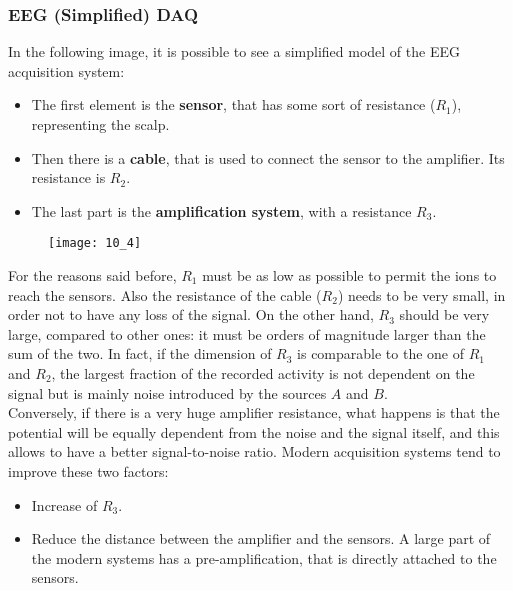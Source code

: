 \subsubsection{EEG (Simplified) DAQ}
In the following image, it is possible to see a simplified model of 
the EEG acquisition system:
\begin{itemize}
    \item The first element is the \textbf{sensor}, that has some sort of resistance (\(R_1\)), representing 
    the scalp.
    \item Then there is a \textbf{cable}, that is used to connect the sensor to the amplifier. 
    Its resistance is \(R_2\).
    \item The last part is the \textbf{amplification system}, with a resistance \(R_3\).
\end{itemize}
\begin{figure}[H]
    \texttt{[image: 10\_4]}
    \centering
\end{figure}
For the reasons said before, \(R_1\) must be as low as possible to permit the ions to reach the sensors. Also the 
resistance of the cable (\(R_2\)) needs to be very small, in order not to have any loss of the signal. On the other hand, \(R_3\) should be very large, compared to other ones: it must be orders of 
magnitude larger than the sum of the two. 
In fact, if the dimension of \(R_3\) is comparable to the one of \(R_1\) and \(R_2\), the largest fraction of the recorded 
activity is not dependent on the signal but is mainly noise introduced by the sources \(A\) and \(B\).\\
Conversely, if there is a very huge amplifier resistance, what happens is that the potential will be equally 
dependent from the noise and the signal itself, and this allows to have a better signal-to-noise ratio.
Modern acquisition systems tend to improve these two factors:
\begin{itemize}
    \item Increase of \(R_3\).
    \item Reduce the distance between the amplifier and the sensors. A large part of the modern systems has a pre-amplification, 
    that is directly attached to the sensors.
\end{itemize}

